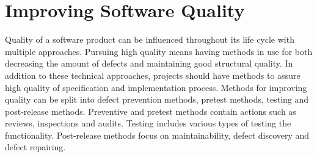 
 \chapter{Improving Software Quality}
 
Quality of a software product can be influenced throughout its life cycle with multiple approaches. Pursuing high quality means having methods in use for both decreasing the amount of defects and maintaining good structural quality. In addition to these technical approaches, projects should have methods to assure high quality of specification and implementation process. Methods for improving quality can be split into defect prevention methods, pretest methods, testing and post-release methods. Preventive and pretest methods contain actions such as reviews, inspections and audits. Testing includes various types of testing the functionality. Post-release methods focus on maintainability, defect discovery and defect repairing.







 

 

 

